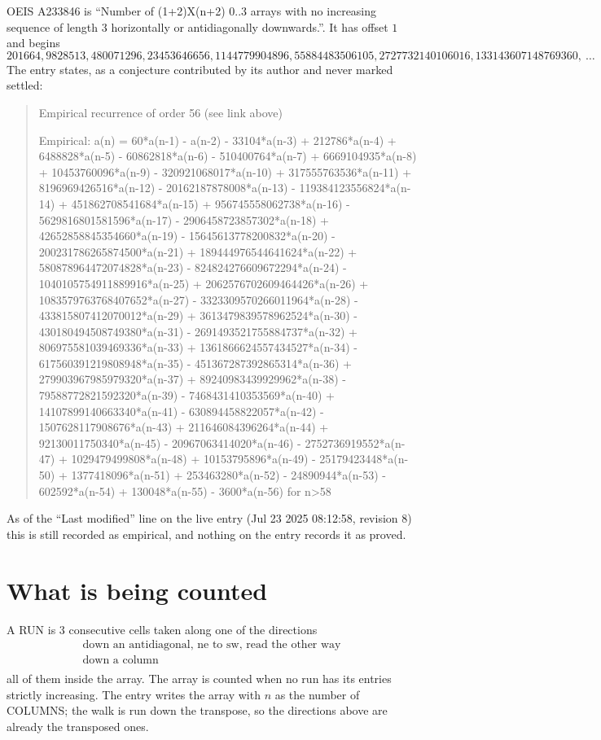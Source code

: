 \documentclass[11pt,a4paper]{article}
\theoremstyle{plain}
\theoremstyle{definition}
\begin{document}
OEIS A233846 is ``Number of (1+2)X(n+2) 0..3 arrays with no increasing sequence of length 3 horizontally or antidiagonally downwards.''. It has offset $1$ and begins
\[
201664, 9828513, 480071296, 23453646656, 1144779904896, 55884483506105, 2727732140106016, 133143607148769360,\ \dots
\]
The entry states, as a conjecture contributed by its author and never marked settled:
\begin{quote}
Empirical recurrence of order 56 (see link above)

Empirical: a(n) = 60*a(n-1) - a(n-2) - 33104*a(n-3) + 212786*a(n-4) + 6488828*a(n-5) - 60862818*a(n-6) - 510400764*a(n-7) + 6669104935*a(n-8) + 10453760096*a(n-9) - 320921068017*a(n-10) + 317555763536*a(n-11) + 8196969426516*a(n-12) - 20162187878008*a(n-13) - 119384123556824*a(n-14) + 451862708541684*a(n-15) + 956745558062738*a(n-16) - 5629816801581596*a(n-17) - 2906458723857302*a(n-18) + 42652858845354660*a(n-19) - 15645613778200832*a(n-20) - 200231786265874500*a(n-21) + 189444976544641624*a(n-22) + 580878964472074828*a(n-23) - 824824276609672294*a(n-24) - 1040105754911889916*a(n-25) + 2062576702609464426*a(n-26) + 1083579763768407652*a(n-27) - 3323309570266011964*a(n-28) - 433815807412070012*a(n-29) + 3613479839578962524*a(n-30) - 430180494508749380*a(n-31) - 2691493521755884737*a(n-32) + 806975581039469336*a(n-33) + 1361866624557434527*a(n-34) - 617560391219808948*a(n-35) - 451367287392865314*a(n-36) + 279903967985979320*a(n-37) + 89240983439929962*a(n-38) - 79588772821592320*a(n-39) - 7468431410353569*a(n-40) + 14107899140663340*a(n-41) - 630894458822057*a(n-42) - 1507628117908676*a(n-43) + 211646084396264*a(n-44) + 92130011750340*a(n-45) - 20967063414020*a(n-46) - 2752736919552*a(n-47) + 1029479499808*a(n-48) + 10153795896*a(n-49) - 25179423448*a(n-50) + 1377418096*a(n-51) + 253463280*a(n-52) - 24890944*a(n-53) - 602592*a(n-54) + 130048*a(n-55) - 3600*a(n-56) for n>58
\end{quote}
As of the ``Last modified'' line on the live entry (Jul 23 2025 08:12:58, revision 8) this is still
recorded as empirical, and nothing on the entry records it as proved.

\section{What is being counted}

A RUN is $3$ consecutive cells taken along one of the directions
\[
\begin{array}{l}
\text{down an antidiagonal, ne to sw, read the other way} \\
\text{down a column} \\
\end{array}
\]
all of them inside the array. The array is counted when no run has its entries strictly increasing. The entry writes the array with $n$ as the number of COLUMNS; the walk is run down the transpose, so the directions above are already the transposed ones.
\end{document}
